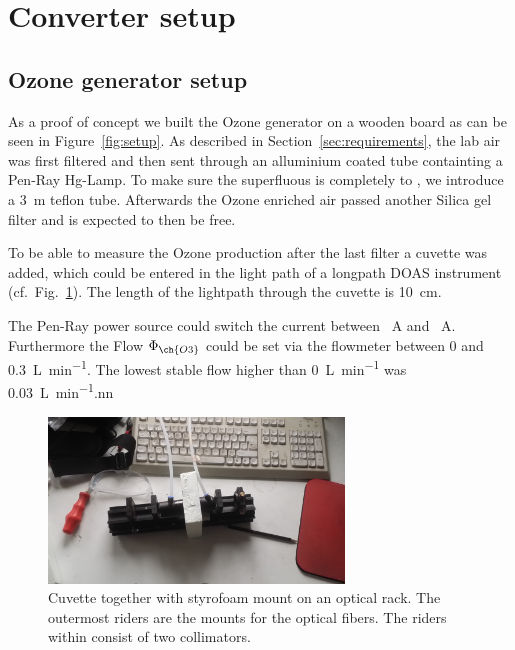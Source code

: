 \section{Converter setup}
\label{sec:setup}

\subsection{Ozone generator setup}
\label{sec:ozone-setup}

As a proof of concept we built the Ozone generator on a wooden board
as can be seen in Figure~\ref{fig:setup}. As described in
Section~\ref{sec:requirements}, the lab air was first filtered and
then sent through an alluminium coated tube containting a Pen-Ray
Hg-Lamp. To make sure the superfluous
 is completely to , we introduce a \SI{3}{\meter}
teflon tube. Afterwards the Ozone enriched air passed another Silica
gel filter and is expected to then be  free.

To be able to measure the Ozone production after the last filter a
cuvette was added, which could be entered in the light path of a
longpath DOAS instrument (cf.\ Fig.~\ref{fig:cuvette}). The length of
the lightpath through the cuvette is \SI{10}{\centi\meter}. 

The Pen-Ray power source could switch the current between
\SI{}{\ampere} and \SI{}{\ampere}. Furthermore the Flow $\Phi_{\ch{O 3}}$ could be set via the
flowmeter between \num{0} and \SI{0.3}{\liter\per\minute}. The lowest
stable flow higher than \SI{0}{\liter\per\minute} was
\SI{0.03}{\liter\per\minute}.nn

\begin{figure}[htbp]
  \centering
  \includegraphics[width=0.7\textwidth]{images/cuvette.jpg}
  \caption{Cuvette together with styrofoam mount on an optical
    rack. The outermost riders are the mounts for the optical
    fibers. The riders within consist of two collimators.}
  \label{fig:cuvette}
\end{figure}

